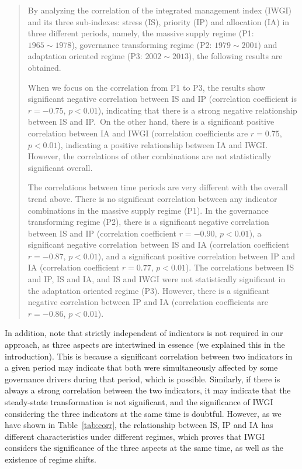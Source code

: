 \begin{quote}
	By analyzing the correlation of the integrated management index (IWGI) and its three sub-indexes: stress (IS), priority (IP) and allocation (IA) in three different periods, namely, the massive supply regime (P1: $1965 \sim 1978$), governance transforming regime (P2: $1979 \sim 2001$) and adaptation oriented regime (P3: $2002 \sim 2013$), the following results are obtained.

	When we focus on the correlation from P1 to P3, the results show significant negative correlation between IS and IP (correlation coefficient is $r = -0.75$, $p < 0.01$), indicating that there is a strong negative relationship between IS and IP.\
	On the other hand, there is a significant positive correlation between IA and IWGI (correlation coefficients are $r = 0.75$, $p < 0.01$), indicating a positive relationship between IA and IWGI. However, the correlations of other combinations are not statistically significant overall.

	The correlations between time periods are very different with the overall trend above.
	There is no significant correlation between any indicator combinations in the massive supply regime (P1).
	In the governance transforming regime (P2), there is a significant negative correlation between IS and IP (correlation coefficient $r = -0.90$, $p < 0.01$), a significant negative correlation between IS and IA (correlation coefficient $r = -0.87$, $p < 0.01$), and a significant positive correlation between IP and IA (correlation coefficient $r = 0.77$, $p < 0.01$).
	The correlations between IS and IP, IS and IA, and IS and IWGI were not statistically significant in the adaptation oriented regime (P3). However, there is a significant negative correlation between IP and IA (correlation coefficients are $r = -0.86$, $p < 0.01$).
\end{quote}

\AR*{} In addition, note that strictly independent of indicators is not required in our approach, as three aspects are intertwined in essence (we explained this in the introduction).
This is because a significant correlation between two indicators in a given period may indicate that both were simultaneously affected by some governance drivers during that period, which is possible.
Similarly, if there is always a strong correlation between the two indicators, it may indicate that the steady-state transformation is not significant, and the significance of IWGI considering the three indicators at the same time is doubtful.
However, as we have shown in Table~\ref{tab:corr}, the relationship between IS, IP and IA has different characteristics under different regimes, which proves that IWGI considers the significance of the three aspects at the same time, as well as the existence of regime shifts.

